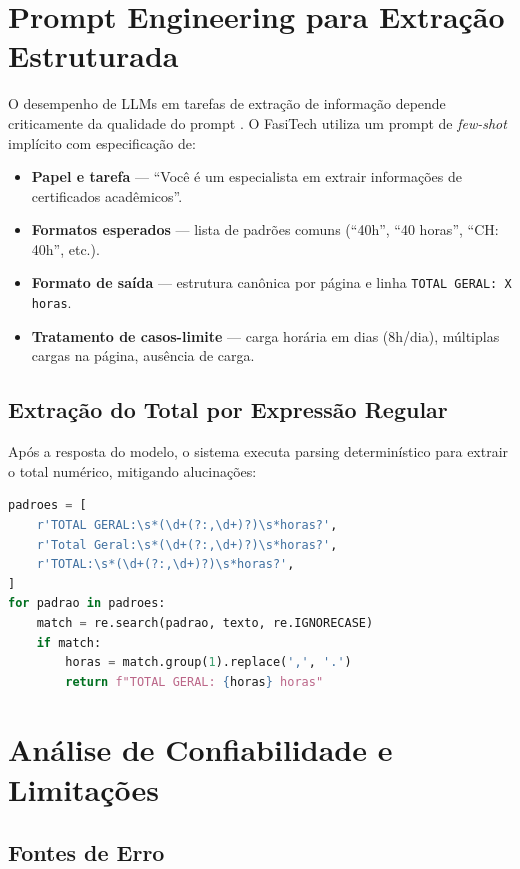 \documentclass[12pt,a4paper]{report}
\begin{document}
\section{Prompt Engineering para Extração Estruturada}

O desempenho de LLMs em tarefas de extração de informação depende
criticamente da qualidade do prompt \autocite{brown2020gpt3}.
O FasiTech utiliza um prompt de \textit{few-shot} implícito com
especificação de:

\begin{itemize}
  \item \textbf{Papel e tarefa} — ``Você é um especialista em extrair
        informações de certificados acadêmicos''.
  \item \textbf{Formatos esperados} — lista de padrões comuns
        (``40h'', ``40 horas'', ``CH: 40h'', etc.).
  \item \textbf{Formato de saída} — estrutura canônica por página e
        linha \texttt{TOTAL GERAL: X horas}.
  \item \textbf{Tratamento de casos-limite} — carga horária em dias
        (8h/dia), múltiplas cargas na página, ausência de carga.
\end{itemize}

\subsection{Extração do Total por Expressão Regular}

Após a resposta do modelo, o sistema executa parsing determinístico
para extrair o total numérico, mitigando alucinações:

\begin{lstlisting}[language=Python,caption={Extração de total com regex.}]
padroes = [
    r'TOTAL GERAL:\s*(\d+(?:,\d+)?)\s*horas?',
    r'Total Geral:\s*(\d+(?:,\d+)?)\s*horas?',
    r'TOTAL:\s*(\d+(?:,\d+)?)\s*horas?',
]
for padrao in padroes:
    match = re.search(padrao, texto, re.IGNORECASE)
    if match:
        horas = match.group(1).replace(',', '.')
        return f"TOTAL GERAL: {horas} horas"
\end{lstlisting}

\section{Análise de Confiabilidade e Limitações}

\subsection{Fontes de Erro}
\end{document}
